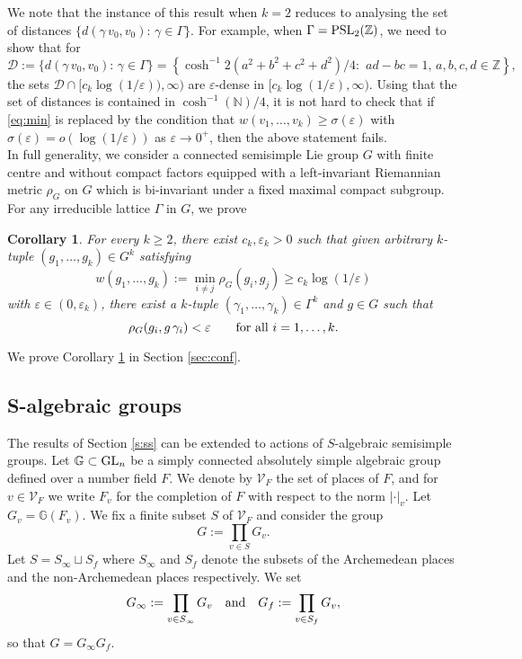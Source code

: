 \documentclass[11pt,reqno,a4paper]{amsart}
\numberwithin{equation}{section}
\newcommand{\bG}{\mathbb{G}}
\newcommand{\bN}{\mathbb{N}}
\newcommand{\bZ}{\mathbb{Z}}
\newcommand{\eps}{\varepsilon}
\theoremstyle{theorem}
\newtheorem{corollary}[theorem]{Corollary}
\theoremstyle{definition}
\begin{document}
We note that the instance of this result when $k=2$ reduces to analysing the set of distances
$\{d(\gamma\, v_0,v_0):\, \gamma\in \Gamma\}$. For example, when $\Gamma=\hbox{PSL}_2(\bZ)$,
we need to show that for 
$$
\mathcal{D}:=\{d(\gamma\, v_0,v_0):\, \gamma\in \Gamma\}
=\left\{\cosh^{-1} 2(a^2+b^2+c^2+d^2)/4:\,\, ad-bc=1,\, a,b,c,d\in\bZ\right\},
$$
the sets $\mathcal{D}\cap [c_k\log(1/\eps)),\infty)$
are $\eps$-dense in $[c_k\log(1/\eps),\infty)$.
Using that the set of distances is contained in $\cosh^{-1}(\bN)/4$, it is not hard to check that
if \eqref{eq:min} is replaced by the condition that $w(v_1,\ldots,v_k)\ge \sigma(\eps)$ with 
$\sigma(\eps)=o(\log(1/\eps))$
as $\eps\to 0^+$, then the above statement fails.\\

In full generality, we consider a connected semisimple Lie group $G$ with finite centre and without compact factors equipped with 
a left-invariant Riemannian metric $\rho_G$ on $G$ which is
bi-invariant under a fixed maximal compact subgroup.
For any irreducible lattice $\Gamma$ in $G$, we prove

\begin{corollary}
\label{main1_cor}
For every $k\ge 2$, there exist $c_k, \eps_k>0$ such that
given arbitrary $k$-tuple $(g_1,\ldots, g_k)\in G^k$
satisfying 
$$
w(g_1,\ldots,g_k):=\min_{i\ne j} \rho_G(g_i,g_j)\ge c_k\log(1/\eps)
$$
with $\eps\in (0,\eps_k)$, there exist a $k$-tuple $(\gamma_1,\ldots, \gamma_k)\in \Gamma^k$
and $g\in G$ such that 
$$
\rho_G(g_i,g\,\gamma_i)<\eps\quad\quad \hbox{for all $i=1,\ldots,k$.}
$$
\end{corollary}



We prove Corollary \ref{main1_cor} in Section \ref{sec:conf}.

\subsection{S-algebraic groups}

The results of Section \ref{s:ss} can be extended to actions
of $S$-algebraic semisimple groups. Let $\bG\subset \hbox{GL}_n$ be a simply connected absolutely simple algebraic group defined over a number field $F$. We denote by $\mathcal{V}_F$ the set of places of $F$, 
and for $v\in \mathcal{V}_F$ we write $F_v$ for the completion of $F$ with respect to the norm $|\cdot|_v$. Let $G_v=\bG(F_v)$. We fix a finite subset $S$ of $\mathcal{V}_F$ and consider the group 
\begin{equation}
\label{eq:GS}
G:=\prod_{v\in S} G_v.
\end{equation}
Let $S=S_\infty\sqcup S_f$ where $S_\infty$ and $S_f$ denote the subsets of the Archemedean places and the non-Archemedean places respectively.
We set 
$$
G_\infty:=\prod_{v\in S_\infty} G_v\quad\hbox{and}\quad G_f:=\prod_{v\in S_f} G_v,
$$
so that $G=G_\infty G_f$.
\end{document}
